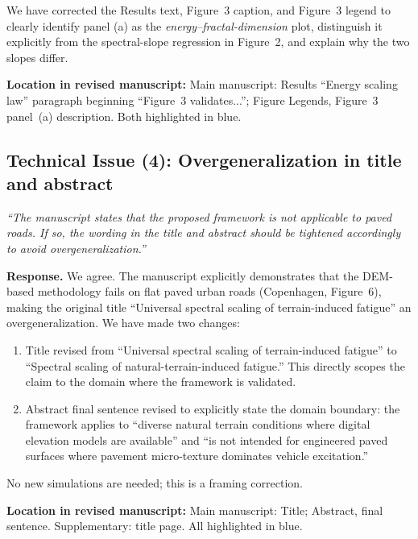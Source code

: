 \documentclass[11pt]{article}
\newcommand{\revquote}[1]{\medskip\noindent\textit{``#1''}\medskip}
\newcommand{\revloc}[1]{\noindent\textbf{Location in revised manuscript:} #1\medskip}
\begin{document}
We have corrected the Results text, Figure~3 caption, and Figure~3 legend to clearly identify panel (a) as the \emph{energy--fractal-dimension} plot, distinguish it explicitly from the spectral-slope regression in Figure~2, and explain why the two slopes differ.

\revloc{Main manuscript: Results ``Energy scaling law'' paragraph beginning ``Figure~3 validates...''; Figure Legends, Figure~3 panel~(a) description. Both highlighted in blue.}

\bigskip

\subsection*{Technical Issue (4): Overgeneralization in title and abstract}

\revquote{The manuscript states that the proposed framework is not applicable to paved roads. If so, the wording in the title and abstract should be tightened accordingly to avoid overgeneralization.}

\noindent\textbf{Response.} We agree. The manuscript explicitly demonstrates that the DEM-based methodology fails on flat paved urban roads (Copenhagen, Figure~6), making the original title ``Universal spectral scaling of terrain-induced fatigue'' an overgeneralization. We have made two changes:

\begin{enumerate}[leftmargin=*]
\item Title revised from ``Universal spectral scaling of terrain-induced fatigue'' to ``Spectral scaling of natural-terrain-induced fatigue.'' This directly scopes the claim to the domain where the framework is validated.
\item Abstract final sentence revised to explicitly state the domain boundary: the framework applies to ``diverse natural terrain conditions where digital elevation models are available'' and ``is not intended for engineered paved surfaces where pavement micro-texture dominates vehicle excitation.''
\end{enumerate}

\noindent No new simulations are needed; this is a framing correction.

\revloc{Main manuscript: Title; Abstract, final sentence. Supplementary: title page. All highlighted in blue.}

\bigskip
\end{document}
